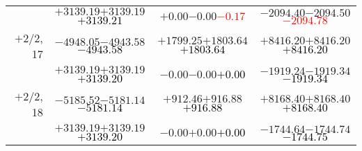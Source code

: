 \documentclass[compress]{beamer}
\begin{document}
\begin{frame}
{\begin{tabular}{r | c | c | c}
           & $+3139.19$\hspace{0.1 cm}$+3139.19$\hspace{0.1 cm}\textcolor{black}{$+3139.21$} & $+0.00$\hspace{0.1 cm}$-0.00$\hspace{0.1 cm}\textcolor{red}{$-0.17$} & $-2094.40$\hspace{0.1 cm}$-2094.50$\hspace{0.1 cm}\textcolor{red}{$-2094.78$} \\
$+$2/2, 17 & $-4948.05$\hspace{0.1 cm}$-4943.58$\hspace{0.1 cm}\textcolor{black}{$-4943.58$} & $+1799.25$\hspace{0.1 cm}$+1803.64$\hspace{0.1 cm}\textcolor{black}{$+1803.64$} & $+8416.20$\hspace{0.1 cm}$+8416.20$\hspace{0.1 cm}\textcolor{black}{$+8416.20$} \\
           & $+3139.19$\hspace{0.1 cm}$+3139.19$\hspace{0.1 cm}\textcolor{black}{$+3139.20$} & $-0.00$\hspace{0.1 cm}$-0.00$\hspace{0.1 cm}\textcolor{black}{$+0.00$} & $-1919.24$\hspace{0.1 cm}$-1919.34$\hspace{0.1 cm}\textcolor{black}{$-1919.34$} \\
$+$2/2, 18 & $-5185.52$\hspace{0.1 cm}$-5181.14$\hspace{0.1 cm}\textcolor{black}{$-5181.14$} & $+912.46$\hspace{0.1 cm}$+916.88$\hspace{0.1 cm}\textcolor{black}{$+916.88$} & $+8168.40$\hspace{0.1 cm}$+8168.40$\hspace{0.1 cm}\textcolor{black}{$+8168.40$} \\
           & $+3139.19$\hspace{0.1 cm}$+3139.19$\hspace{0.1 cm}\textcolor{black}{$+3139.20$} & $-0.00$\hspace{0.1 cm}$+0.00$\hspace{0.1 cm}\textcolor{black}{$+0.00$} & $-1744.64$\hspace{0.1 cm}$-1744.74$\hspace{0.1 cm}\textcolor{black}{$-1744.75$} \\
\end{tabular}}
\end{frame}
\end{document}
